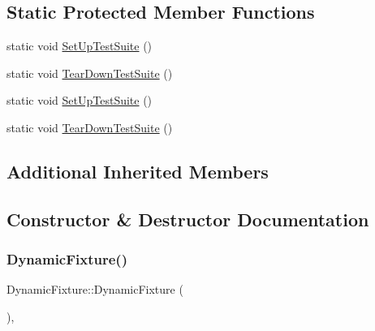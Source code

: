 \subsection*{Static Protected Member Functions}
\begin{DoxyCompactItemize}
\item 
static void \mbox{\hyperlink{class_dynamic_fixture_ae6e3117ba3fcc3108ac094d96ea441d6}{Set\+Up\+Test\+Suite}} ()
\item 
static void \mbox{\hyperlink{class_dynamic_fixture_a907d5981006ea512b9cf3f7819583fc0}{Tear\+Down\+Test\+Suite}} ()
\item 
static void \mbox{\hyperlink{class_dynamic_fixture_ae6e3117ba3fcc3108ac094d96ea441d6}{Set\+Up\+Test\+Suite}} ()
\item 
static void \mbox{\hyperlink{class_dynamic_fixture_a907d5981006ea512b9cf3f7819583fc0}{Tear\+Down\+Test\+Suite}} ()
\end{DoxyCompactItemize}
\subsection*{Additional Inherited Members}


\subsection{Constructor \& Destructor Documentation}
\mbox{\label{class_dynamic_fixture_a824c439775903dff798c35dbfab09d99}} 
\subsubsection{\texorpdfstring{DynamicFixture()}{DynamicFixture()}\hspace{0.1cm}{\footnotesize\ttfamily [1/2]}}
{\footnotesize\ttfamily Dynamic\+Fixture\+::\+Dynamic\+Fixture (\begin{DoxyParamCaption}{ }\end{DoxyParamCaption})\hspace{0.3cm}{\ttfamily [inline]}, {\ttfamily [protected]}}

\mbox{\label{class_dynamic_fixture_ae9848b5a982ea389bf675356d842533d}} 

